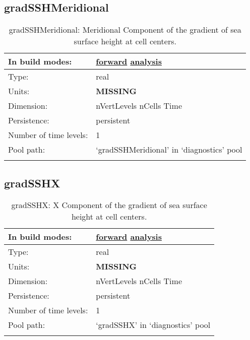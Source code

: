 \subsection[gradSSHMeridional]{gradSSHMeridional}
\label{subsec:var_sec_diagnostics_gradSSHMeridional}
\begin{center}
\begin{longtable}{| p{2.0in} | p{4.0in} |}
        \hline 
        In build modes: & \hyperref[subsec:forward_var_tab_diagnostics]{forward} \hyperref[subsec:analysis_var_tab_diagnostics]{analysis} \\
        \hline 
        Type: & real \\
        \hline 
        Units: & {\bf \color{red} MISSING} \\
        \hline 
        Dimension: & nVertLevels nCells Time \\
        \hline 
        Persistence: & persistent \\
        \hline 
        Number of time levels: & 1 \\
        \hline 
            Pool path: & `gradSSHMeridional' in `diagnostics' pool \\
		 \hline 
    \caption{gradSSHMeridional: Meridional Component of the gradient of sea surface height at cell centers.}
\end{longtable}
\end{center}
\subsection[gradSSHX]{gradSSHX}
\label{subsec:var_sec_diagnostics_gradSSHX}
\begin{center}
\begin{longtable}{| p{2.0in} | p{4.0in} |}
        \hline 
        In build modes: & \hyperref[subsec:forward_var_tab_diagnostics]{forward} \hyperref[subsec:analysis_var_tab_diagnostics]{analysis} \\
        \hline 
        Type: & real \\
        \hline 
        Units: & {\bf \color{red} MISSING} \\
        \hline 
        Dimension: & nVertLevels nCells Time \\
        \hline 
        Persistence: & persistent \\
        \hline 
        Number of time levels: & 1 \\
        \hline 
            Pool path: & `gradSSHX' in `diagnostics' pool \\
		 \hline 
    \caption{gradSSHX: X Component of the gradient of sea surface height at cell centers.}
\end{longtable}
\end{center}
